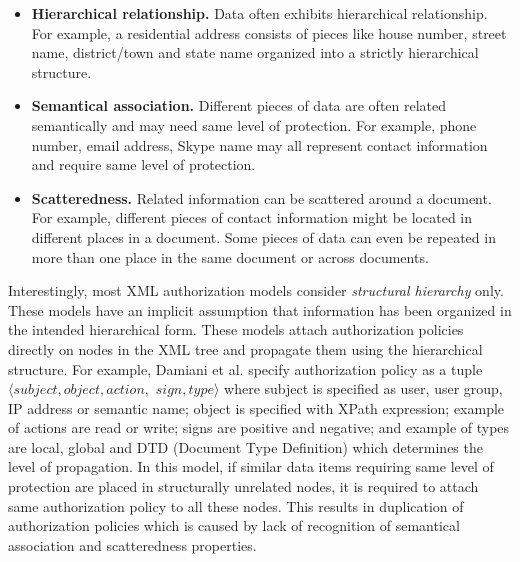 \begin{itemize}
	
	\item \textbf{Hierarchical relationship.} Data often exhibits hierarchical relationship. For example, a residential address consists of pieces like house number, street name, district/town and state name organized into a strictly hierarchical structure. 
	
	
	\item \textbf{Semantical association.} Different pieces of data are often related semantically and may need same level of protection.  For example, phone number, email address, Skype name may all represent contact information and require same level of protection.
	
	\item \textbf{Scatteredness.} Related information can be scattered around a document. For example, different pieces of contact information might be located in different places in a document. Some pieces of data can even be repeated in more than one place in the same document or across documents.  
	
\end{itemize}




Interestingly, most XML authorization models \cite{policy-based4,policy-based2,policy-based5,policy-based6} consider \textit{structural hierarchy} only. These models have an implicit assumption that information has been organized in the intended hierarchical form. These models attach authorization policies directly on nodes in the XML tree  and propagate them using the hierarchical structure. For example, Damiani et al. \cite{damiani2002fine} specify authorization policy as a tuple $\langle subject, object, action,$ $sign, type \rangle$ where subject is specified as user, user group, IP address or semantic name;  object is specified with XPath expression; example of actions are read or  write; signs are positive and negative; and example of types are local, global and DTD (Document Type Definition) which determines the level of propagation.  In this model, if similar data items requiring same level of protection are placed in structurally unrelated nodes, it is required to attach same authorization policy to all these nodes. This results in duplication of authorization policies which is caused by lack of recognition of semantical association and scatteredness properties. 

